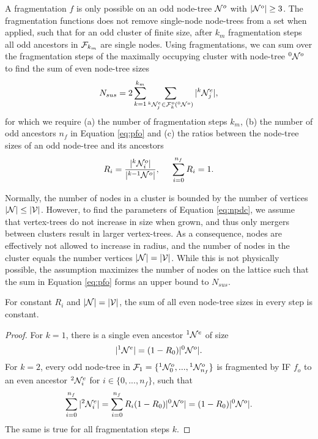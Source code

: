 A fragmentation $f$ is only possible on an odd node-tree $\mathcal{N}^o$ with $|{\mathcal{N}^o}| \geq 3$. The fragmentation functions does not remove single-node node-trees from a set when applied, such that for an odd cluster of finite size, after $k_m$ fragmentation steps all odd ancestors in $\mathcal{F}_{k_{m}}$ are single nodes. Using fragmentations, we can sum over the fragmentation steps of the maximally occupying cluster with node-tree ${}^{0}\mathcal{N}^o$ to find the sum of even node-tree sizes
\begin{equation}\label{eq:npdc}
  N_{sus} = 2\sum_{k=1}^{k_{m}}{ \sum_{ \pre{k}\nset_j^e \in \m{F}^o_k(\pre{0}\nset^o) }{ \abs{\pre{k}\nset_j^e}} },
\end{equation}
for which we require (a) the number of fragmentation steps $k_m$, (b) the number of odd ancestors $n_f$ in Equation \eqref{eq:pfo} and (c) the ratios between the node-tree sizes of an odd node-tree and its ancestors
\begin{equation}\label{eq:ratio}
  R_i = \frac{\abs{\pre{k}\nset^o_i}}{\abs{\pre{k-1}\nset^o}}, \hspace{0.5cm} \sum_{i=0}^{n_f}{R_i} = 1.
\end{equation}

Normally, the number of nodes in a cluster is bounded by the number of vertices $\lvert\mathcal{N}\rvert\leq \lvert\mathcal{V}\rvert$. However, to find the parameters of Equation \eqref{eq:npdc}, we assume that vertex-trees do not increase in size  when grown, and thus only mergers between clusters result in larger vertex-trees. As a consequence, nodes are effectively not allowed to increase in radius, and the number of nodes in the cluster equals the number vertices $\lvert\mathcal{N}\rvert=\lvert\mathcal{V}\rvert$. While this is not physically possible, the assumption maximizes the number of nodes on the lattice such that the sum in Equation \eqref{eq:pfo} forms an upper bound to $N_{sus}$.

\begin{lemma}\label{lem:evenconstant}
  For constant $R_i$ and $\lvert\mathcal{N}\rvert=\lvert\mathcal{V}\rvert$, the sum of all even node-tree sizes in every step is constant. 
\end{lemma}
\begin{proof}
  For $k=1$, there is a single even ancestor ${}^{1}\mathcal{N}^e$ of size 
  \begin{equation*}
    \lvert{}^{1}\mathcal{N}^e\rvert = (1 - R_0)\lvert{}^{0}\mathcal{N}^o\rvert.
  \end{equation*}
  For $k=2$, every odd node-tree in $\mathcal{F}_1=\{{}^{1}\mathcal{N}^o_0,...,{}^{1}\mathcal{N}^{o}_{n_f}\}$ is fragmented by IF $f_o$ to an even ancestor ${}^{2}\mathcal{N}^e_i$ for $i \in \{0,...,n_f \}$, such that 
  \begin{equation*}
    \sum_{i=0}^{n_f}{\lvert{}^{2}\mathcal{N}^e_i\rvert}  = \sum_{i=0}^{n_f}{R_i(1 - R_0)\lvert{}^{0}\mathcal{N}^o\rvert}= (1 - R_0)\lvert{}^{0}\mathcal{N}^o\rvert.
  \end{equation*}
  The same is true for all fragmentation steps $k$. 
\end{proof}


